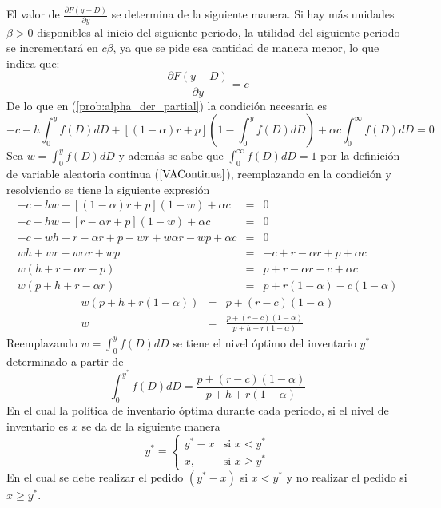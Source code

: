 El valor de $\frac{\partial F(y-D)}{\partial y}$ se determina de la siguiente manera. Si hay más unidades $\beta > 0$ disponibles al inicio del siguiente periodo, la utilidad del siguiente periodo se incrementará en $c \beta$, ya que se pide esa cantidad de manera menor, lo que indica que:
$$
\frac{\partial F(y-D)}{\partial y}=c
$$
De lo que en (\ref{prob:alpha_der_partial}) la condición necesaria es
$$
-c-h \int_{0}^{y}f(D)dD+[(1-\alpha)r+p]\left( 1- \int_{0}^{y}f(D)dD \right) + \alpha c \int_{0}^{\infty}f(D)dD = 0
$$
Sea $w = \int_{0}^{y}f(D)dD$ y además se sabe que $\int_{0}^{\infty}f(D)dD=1$ por la definición de variable aleatoria continua ($\ref{VAContinua}$), reemplazando en la condición y resolviendo se tiene la siguiente expresión
\begin{eqnarray}
	-c-hw+[(1-\alpha)r+p](1-w)+\alpha c &=& 0 \nonumber \\
	-c-hw+[r-\alpha r + p](1-w)+ \alpha c &=& 0 \nonumber \\
	-c-wh+r-\alpha r + p - wr + w \alpha r - w p + \alpha c &=& 0 \nonumber \\
	wh + wr - w \alpha r + wp &=& -c+r - \alpha r + p + \alpha c \nonumber \\
	w (h+r- \alpha r + p) &=& p + r - \alpha r - c + \alpha c \nonumber \\
	w (p+h+r- \alpha r) &=& p + r(1 - \alpha) -c(1 - \alpha) \nonumber
\end{eqnarray}
\begin{eqnarray}
	w (p+h+r(1- \alpha)) &=& p + (r-c)(1 - \alpha) \nonumber \\
	w &=& \frac{p + (r-c)(1 - \alpha)}{p+h+r(1- \alpha)} \nonumber
\end{eqnarray}
Reemplazando $w = \int_{0}^{y}f(D)dD$ se tiene el nivel óptimo del inventario $y^*$ determinado a partir de
\begin{equation}
	\int_{0}^{y^*}f(D)dD = \frac{p + (r-c)(1 - \alpha)}{p+h+r(1- \alpha)}
\end{equation}
En el cual la política de inventario óptima durante cada periodo, si el nivel de inventario es $x$ se da de la siguiente manera
\begin{equation}
	y^* =
	\left\{
	\begin{array}{ll}
		y^* - x & \text{si } x < y^* \\
		x, & \text{si } x \geq y^*
	\end{array}
	\right.
\end{equation}
En el cual se debe realizar el pedido $({y}^{*}-x)$ si $x < y^*$ y no realizar el pedido si $x \geq y^*$.
